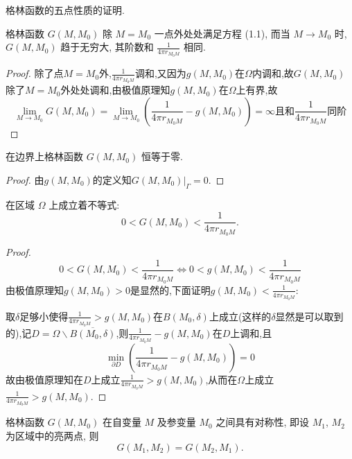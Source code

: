 \begin{note}
  格林函数的五点性质的证明.

  \begin{property}
    格林函数 $G(M, M_0)$ 除 $M=M_0$ 一点外处处满足方程 (1.1), 而当 $M\to M_0$ 时,
    $G(M, M_0)$ 趋于无穷大, 其阶数和 $\frac{1}{4\pi r_{M_0M}}$ 相同.
  \end{property}

  \begin{proof}
    除了点$M=M_0$外,$\frac{1}{4\pi r_{M_0M}}$调和,又因为$g(M,M_0)$在$\varOmega$内调和,故$G(M,M_0)$除了$M=M_0$外处处调和,由极值原理知$g(M,M_0)$在$\varOmega$上有界,故
    \[\lim_{M\to M_0}G(M,M_0)=\lim_{M\to M_0}\left(\frac{1}{4\pi r_{M_0M}}-g(M,M_0)\right)=\infty\mbox{且和}\frac{1}{4\pi r_{M_0M}}\mbox{同阶}\]
  \end{proof}

  \begin{property}
    在边界上格林函数 $G(M, M_0)$ 恒等于零.
  \end{property}

  \begin{proof}
    由$g(M,M_0)$的定义知$G(M,M_0)|_{\varGamma}=0$.
  \end{proof}

  \begin{property}
    在区域 $\varOmega$ 上成立着不等式:
    \[0 < G(M, M_0) < \frac{1}{4\pi r_{M_0M}}.\]
  \end{property}
  
  \begin{proof}
    \[0<G(M,M_0)<\frac{1}{4\pi r_{M_0M}}\Leftrightarrow 0<g(M,M_0)<\frac{1}{4\pi r_{M_0M}}\]
    由极值原理知$g(M,M_0)>0$是显然的,下面证明$g(M,M_0)<\frac{1}{4\pi r_{M_0M}}$:

    取$\delta$足够小使得$\frac{1}{4\pi r_{M_0M}}>g(M,M_0)$在$B(M_0,\delta)$上成立(这样的$\delta$显然是可以取到的),记$D=\varOmega\backslash\overline{B(M_0,\delta)}$,则$\frac{1}{4\pi r_{M_0M}}-g(M,M_0)$在$D$上调和,且
    \[\min_{\partial D}\left(\frac{1}{4\pi r_{M_0M}}-g(M,M_0)\right)=0\]
    故由极值原理知在$D$上成立$\frac{1}{4\pi r_{M_0M}}>g(M,M_0)$,从而在$\varOmega$上成立$\frac{1}{4\pi r_{M_0M}}>g(M,M_0)$.
  \end{proof}

  \begin{property}
    格林函数 $G(M, M_0)$ 在自变量 $M$ 及参变量 $M_0$ 之间具有对称性, 即设
    $M_1$, $M_2$ 为区域中的亮两点, 则
    \[G(M_1, M_2) = G(M_2, M_1).\]
  \end{property}
  

\end{note}
